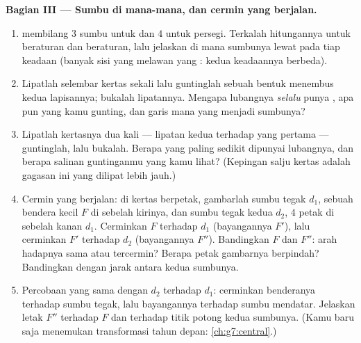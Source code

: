 \begin{problem}
\medskip
\noindent\textbf{Bagian III --- Sumbu di mana-mana, dan cermin yang
berjalan.}
\begin{enumerate}[resume]
  \item {} membilang $3$ sumbu untuk
         dan $4$ untuk persegi. Terkalah
        hitungannya untuk  beraturan dan 
        beraturan, lalu jelaskan di mana sumbunya lewat pada tiap
        keadaan (banyak sisi yang  melawan yang : kedua
        keadaannya berbeda).
  \item Lipatlah selembar kertas sekali lalu guntinglah sebuah bentuk
        menembus kedua lapisannya; bukalah lipatannya. Mengapa
        lubangnya \emph{selalu} punya , apa pun yang
        kamu gunting, dan garis mana yang menjadi sumbunya?
  \item Lipatlah kertasnya dua kali --- lipatan kedua 
        terhadap yang pertama --- guntinglah, lalu bukalah. Berapa
         yang paling sedikit dipunyai lubangnya, dan
        berapa salinan guntinganmu yang kamu lihat? (Kepingan salju
        kertas adalah gagasan ini yang dilipat lebih jauh.)
  \item Cermin yang berjalan: di kertas berpetak, gambarlah sumbu
        tegak $d_1$, sebuah bendera kecil $F$ di sebelah kirinya, dan
        sumbu tegak kedua $d_2$, $4$ petak di sebelah kanan $d_1$.
        Cerminkan $F$ terhadap $d_1$ (bayangannya $F'$), lalu
        cerminkan $F'$ terhadap $d_2$ (bayangannya $F''$).
        Bandingkan $F$ dan $F''$: arah hadapnya sama atau tercermin?
        Berapa petak gambarnya berpindah? Bandingkan dengan jarak
        antara kedua sumbunya.
  \item Percobaan yang sama dengan $d_2$ \emph{} terhadap
        $d_1$: cerminkan benderanya terhadap sumbu tegak, lalu
        bayangannya terhadap sumbu mendatar. Jelaskan letak $F''$
        terhadap $F$ dan terhadap titik potong kedua sumbunya. (Kamu
        baru saja menemukan transformasi tahun depan:
        \cref{ch:g7:central}.)

\end{enumerate}
\end{problem}
